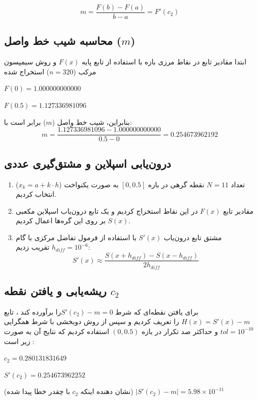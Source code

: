 \documentclass{article}
\begin{document}
\begin{flushright}
 \begin{equation}
 	m = \frac{F(b) - F(a)}{b - a} = F'(c_2)
 \end{equation}
 
 \subsection{محاسبه شیب خط واصل ($m$)}
 ابتدا مقادیر تابع در نقاط مرزی بازه با استفاده از تابع پایه $F(x)$ و روش سیمپسون مرکب ($n = 320$) استخراج شده
 \begin{center}
 	$F(0) = 1.000000000000$
 	
 	$F(0.5) = 1.127336981096$
 \end{center}
 بنابراین، شیب خط واصل ($m$) برابر است با:
 \begin{equation}
 	m = \frac{1.127336981096-1.000000000000}{0.5 - 0} = 0.254673962192
 \end{equation}
 \subsection{درون‌یابی اسپلاین و مشتق‌گیری عددی}
 \begin{enumerate}
 	\item تعداد $N = 11$ نقطه گرهی در بازه $[0, 0.5]$ به صورت یکنواخت ($x_k = a + k \cdot h$) انتخاب کردیم.
 	\item مقادیر تابع $F(x)$ در این نقاط استخراج کردیم و یک تابع درون‌یاب اسپلاین مکعبی $S(x)$ بر روی این گره‌ها اعمال کردیم.
 	\item مشتق تابع درون‌یاب $S'(x)$ با استفاده از فرمول تفاضل مرکزی با گام $h_{diff} = 10^{-6}$ تقریب زدیم:
 	\begin{equation}
 		S'(x) \approx \frac{S(x + h_{diff}) - S(x - h_{diff})}{2 h_{diff}}
 	\end{equation}
 \end{enumerate}
 \subsection{ریشه‌یابی و یافتن نقطه $c_2$}
 برای یافتن نقطه‌ای که شرط $S'(c_2) - m = 0$را برآورده کند ، تابع $H(x) = S'(x) - m$ را تعریف کردیم و سپس از روش دوبخشی با شرط همگرایی $tol= 10^{-10}$ و حداکثر صد تکرار در بازه $(0,0.5)$ استفاده کردیم که نتایج آن به صورت زیر است :
\begin{flushleft}
	$c_2 = 0.280131831649$
	
	$S'(c_2) = 0.254673962252$
	
	(نشان دهنده اینکه $c_2$ با چقدر خطا پیدا شده)	$|S'(c_2) - m| = 5.98 \times 10^{-11}$
\end{flushleft}

\end{flushright}
\end{document}
